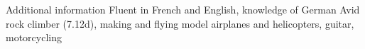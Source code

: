 \begin{rubric}{Additional information}
\entry*[Languages]%
  Fluent in French and English, knowledge of German
%
%
\entry*[Hobbies]%
  Avid rock climber (7.12d), 
  making and flying model airplanes and helicopters,
  guitar,
  motorcycling
%
%
\end{rubric}
